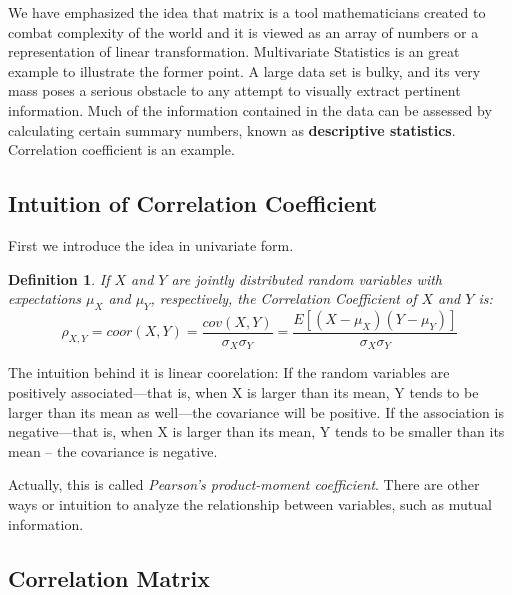 \documentclass[a4paper]{book}
\newtheorem{definition}{Definition}[section]
\begin{document}
  We have emphasized the idea that matrix is a tool mathematicians
  created to combat complexity of the world and it is viewed as an array
  of numbers or a representation of linear transformation. Multivariate
  Statistics is an great example to illustrate the former point. A large
  data set is bulky, and its very mass poses a serious obstacle to any
  attempt to visually extract pertinent information. Much of the
  information contained in the data can be assessed by calculating
  certain summary numbers, known as \textbf{descriptive
    statistics}\cite{johnson2007applied}. Correlation coefficient is an
  example.

    \subsection{Intuition of Correlation Coefficient}

    First we introduce the idea in univariate form.

    \begin{definition}
      If $X$ and $Y$ are jointly distributed random variables with
      expectations $\mu_X$ and $\mu_Y$, respectively, the Correlation
      Coefficient of $X$ and $Y$ is:
      \begin{displaymath}
        \rho_{X,Y} = coor(X,Y) = \frac{cov(X,Y)}{\sigma_X\sigma_Y} = \frac{E[(X
        - \mu_X)(Y - \mu_Y)]}{\sigma_X\sigma_Y}
      \end{displaymath}
    \end{definition}

    The intuition behind it is linear coorelation: If the random variables
    are positively associated—that is, when X is larger than its mean, Y
    tends to be larger than its mean as well—the covariance will be
    positive. If the association is negative—that is, when X is larger
    than its mean, Y tends to be smaller than its mean -- the covariance
    is negative.\cite{rice2007mathematical}

    Actually, this is called \textit{Pearson's product-moment
    coefficient}.\cite{wiki_Correlation_and_dependence} There are other ways or intuition to analyze the
    relationship between variables, such as mutual information.

    \subsection{Correlation Matrix}
\end{document}
